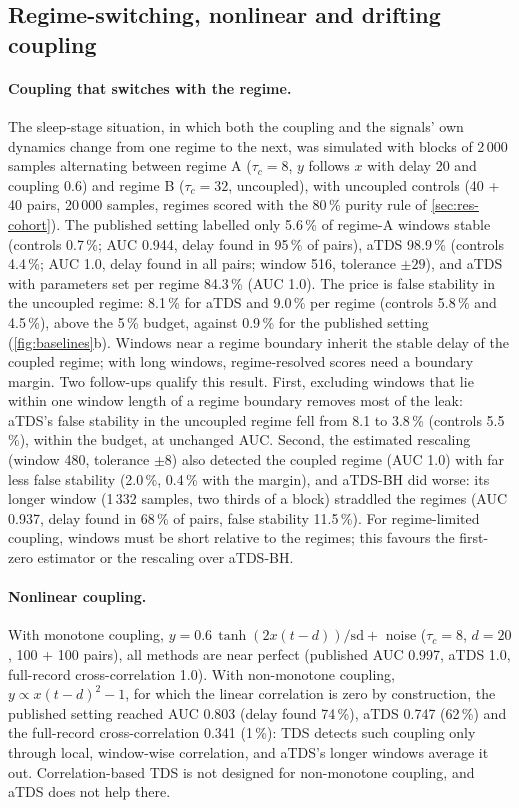 \documentclass[11pt,a4paper]{article}
\begin{document}
\subsection{Regime-switching, nonlinear and drifting coupling}
\label{sec:res-hard}
\paragraph{Coupling that switches with the regime.} The sleep-stage situation, in which both the coupling and the signals' own dynamics change from one regime to the next, was simulated with blocks of 2\,000 samples alternating between regime A ($\tau_c = 8$, $y$ follows $x$ with delay 20 and coupling 0.6) and regime B ($\tau_c = 32$, uncoupled), with uncoupled controls (40 + 40 pairs, 20\,000 samples, regimes scored with the 80\,\% purity rule of \cref{sec:res-cohort}). The published setting labelled only 5.6\,\% of regime-A windows stable (controls 0.7\,\%; AUC 0.944, delay found in 95\,\% of pairs), aTDS 98.9\,\% (controls 4.4\,\%; AUC 1.0, delay found in all pairs; window 516, tolerance $\pm29$), and aTDS with parameters set per regime 84.3\,\% (AUC 1.0). The price is false stability in the uncoupled regime: 8.1\,\% for aTDS and 9.0\,\% per regime (controls 5.8\,\% and 4.5\,\%), above the 5\,\% budget, against 0.9\,\% for the published setting (\cref{fig:baselines}b). Windows near a regime boundary inherit the stable delay of the coupled regime; with long windows, regime-resolved scores need a boundary margin. Two follow-ups qualify this result. First, excluding windows that lie within one window length of a regime boundary removes most of the leak: aTDS's false stability in the uncoupled regime fell from 8.1 to 3.8\,\% (controls 5.5\,\%), within the budget, at unchanged AUC. Second, the estimated rescaling (window 480, tolerance $\pm8$) also detected the coupled regime (AUC 1.0) with far less false stability (2.0\,\%, 0.4\,\% with the margin), and aTDS-BH did worse: its longer window (1\,332 samples, two thirds of a block) straddled the regimes (AUC 0.937, delay found in 68\,\% of pairs, false stability 11.5\,\%). For regime-limited coupling, windows must be short relative to the regimes; this favours the first-zero estimator or the rescaling over aTDS-BH.

\paragraph{Nonlinear coupling.} With monotone coupling, $y = 0.6\,\tanh(2x(t-d))/\mathrm{sd} + $ noise ($\tau_c = 8$, $d = 20$, 100 + 100 pairs), all methods are near perfect (published AUC 0.997, aTDS 1.0, full-record cross-correlation 1.0). With non-monotone coupling, $y \propto x(t-d)^2 - 1$, for which the linear correlation is zero by construction, the published setting reached AUC 0.803 (delay found 74\,\%), aTDS 0.747 (62\,\%) and the full-record cross-correlation 0.341 (1\,\%): TDS detects such coupling only through local, window-wise correlation, and aTDS's longer windows average it out. Correlation-based TDS is not designed for non-monotone coupling, and aTDS does not help there.
\end{document}
